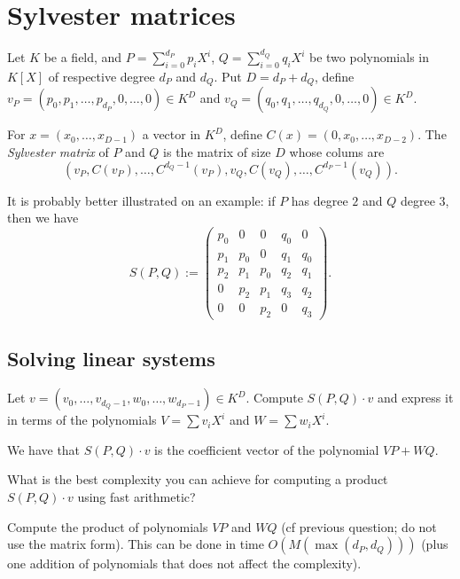 \documentclass[11pt]{exam}
\theoremstyle{definition}
\begin{document}
{\section{Sylvester matrices}

Let $K$ be a field, and
$P = \sum_{i=0}^{d_P} p_i X^i$, $Q = \sum_{i=0}^{d_Q} q_i X^i$ be two polynomials in $K[X]$ of respective degree $d_P$ and $d_Q$. Put $D = d_P + d_Q$,
define $v_P = (p_0, p_1,\dots, p_{d_P}, 0, \dots, 0) \in K^{D}$
and $v_Q = (q_0, q_1,\dots, q_{d_Q}, 0, \dots, 0) \in K^D$.

For $x = (x_0, \dots, x_{D-1})$ a vector in $K^D$, define
$C(x) = (0, x_0, \dots, x_{D-2})$.
The \emph{Sylvester matrix} of $P$ and $Q$ is the matrix of
size $D$ whose colums are
$$(v_P, C(v_P), \dots, C^{d_Q-1}(v_P), v_Q, C(v_Q), \dots, C^{d_P - 1}(v_Q)).$$

It is probably better illustrated on an example: if $P$ has degree $2$ and
$Q$ degree $3$, then we have
$$S(P, Q) := \left(
\begin{array}{ccccccc}
p_0 & 0 & 0 & q_0 & 0 \\
p_1 & p_0 & 0 & q_1 & q_0\\
p_2 & p_1& p_0 & q_2 & q_1\\
0 & p_2 & p_1 & q_3 & q_2 \\
0 & 0 & p_2 & 0 & q_3
\end{array}
\right).
$$

\subsection{Solving linear systems}

\begin{questions}
	\question Let $v = (v_0, \dots, v_{d_Q - 1}, w_0, \dots, w_{d_P - 1})
	\in K^{D}$. Compute $S(P, Q)\cdot v$ and express it in terms
	of the polynomials $V = \sum v_i X^i$ and $W = \sum w_i X^i$.
	
	\begin{solution}
		We have that $S(P, Q)\cdot v$ is the coefficient vector of the polynomial $VP + WQ$.
	\end{solution}
	
	\question What is the best complexity you can achieve for computing
	a product $S(P, Q) \cdot v$ using fast arithmetic?
	
	\begin{solution}
		Compute the product of polynomials $VP$ and $WQ$ (cf previous question; do not use the matrix form). This can be done in time $O(M(\max(d_P, d_Q)))$ (plus one addition of polynomials that does not affect the complexity).
	\end{solution}
	

\end{questions}}
\end{document}
